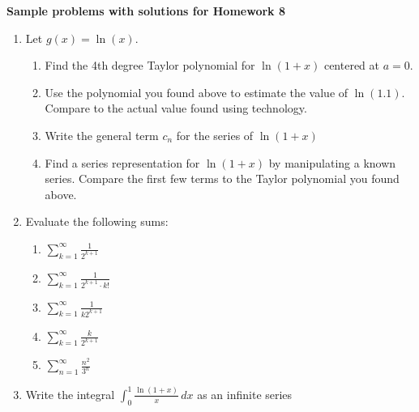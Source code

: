 \documentclass{article}
\begin{document}
\begin{center}
\textbf{
    Sample problems with solutions for Homework 8}
\end{center}

\begin{enumerate}

\item Let $g(x)=\ln(x)$.  
    \begin{enumerate}
        \item Find the 4th degree Taylor polynomial for $\ln(1+x)$ centered at $a=0$. 
        \item Use the polynomial you found above to estimate the value of $\ln(1.1)$. Compare to the actual value found using technology.
        \item Write the general term $c_n$ for the series of $\ln(1+x)$
        \item Find a series representation for $\ln(1+x)$ by manipulating a known series. Compare the first few terms to the Taylor polynomial you found above.
\end{enumerate}
\item Evaluate the following sums:
\begin{enumerate}
    \item $\sum_{k=1}^\infty \frac{1}{2^{k+1}}$
    \item $\sum_{k=1}^\infty \frac{1}{2^{k+1}\cdot k!}$
    \item $\sum_{k=1}^\infty \frac{1}{k2^{k+1}}$
    \item $\sum_{k=1}^\infty \frac{k}{2^{k+1}}$
    \item $\sum_{n=1}^\infty \frac{n^2}{3^{n}}$
    \end{enumerate}
\item Write the integral $\int_0^1 \frac{\ln(1+x)}{x}\,dx$ as an infinite series
    \end{enumerate}
    
\end{document}

